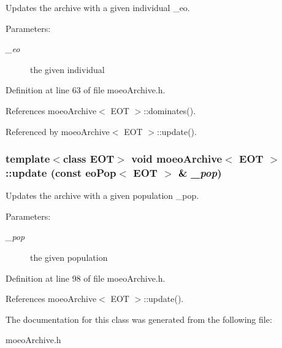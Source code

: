Updates the archive with a given individual \_\-eo. 

\begin{Desc}
\item[Parameters:]
\begin{description}
\item[{\em \_\-eo}]the given individual \end{description}
\end{Desc}


Definition at line 63 of file moeo\-Archive.h.

References moeo\-Archive$<$ EOT $>$::dominates().

Referenced by moeo\-Archive$<$ EOT $>$::update().
\subsubsection{\setlength{\rightskip}{0pt plus 5cm}template$<$class EOT$>$ void {\bf moeo\-Archive}$<$ EOT $>$::update (const {\bf eo\-Pop}$<$ EOT $>$ \& {\em \_\-pop})\hspace{0.3cm}{\tt  [inline]}}\label{classmoeoArchive_58e891ab400ba352e8b0a341d0bdc107}


Updates the archive with a given population \_\-pop. 

\begin{Desc}
\item[Parameters:]
\begin{description}
\item[{\em \_\-pop}]the given population \end{description}
\end{Desc}


Definition at line 98 of file moeo\-Archive.h.

References moeo\-Archive$<$ EOT $>$::update().

The documentation for this class was generated from the following file:\begin{CompactItemize}
\item 
moeo\-Archive.h\end{CompactItemize}
